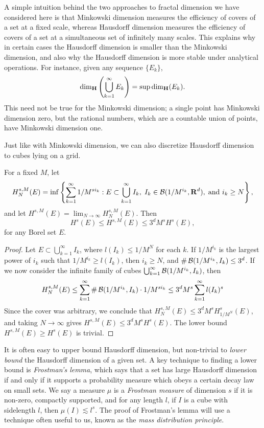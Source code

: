 A simple intuition behind the two approaches to fractal dimension we have considered here is that Minkowski dimension measures the efficiency of covers of a set at a fixed scale, whereas Hausdorff dimension measures the efficiency of covers of a set at a simultaneous set of infinitely many scales. This explains why in certain cases the Hausdorff dimension is smaller than the Minkowski dimension, and also why the Hausdorff dimension is more stable under analytical operations. For instance, given any sequence $\{ E_k \}$,
%
\[ \operatorname{\dim_{\mathbf{H}}} \left(\bigcup_{k = 1}^\infty E_k \right) = \sup \operatorname{\dim_{\mathbf{H}}}(E_k). \]
%
This need not be true for the Minkowski dimension; a single point has Minkowski dimension zero, but the rational numbers, which are a countable union of points, have Minkowski dimension one.

Just like with Minkowski dimension, we can also discretize Hausdorff dimension to cubes lying on a grid.

\begin{lemma}
	For a fixed $M$, let
	\[ H^{s,M}_N(E) = \inf \left\{ \sum_{k = 1}^\infty 1/M^{s i_k} : E \subset \bigcup_{k = 1}^\infty I_k,\; I_k \in \operatorname{\mathcal{B}}(1/M^{i_k},\operatorname{\mathbf{R}}^d), \; \text{and}\ i_k \geq N \right\}, \]
	and let $H^{s,M}(E) = \lim_{N \to \infty} H^{s,M}_N(E)$. Then
	\[ H^s(E) \leq H^{s,M}(E) \leq 3^d M^s H^s(E), \]
	for any Borel set $E$.
\end{lemma}
\begin{proof}
	Let $E \subset \bigcup_{k = 1}^\infty I_k$, where $l(I_k) \leq 1/M^N$ for each $k$. If $1/M^{i_k}$ is the largest power of $i_k$ such that $1/M^{i_k} \geq l(I_k)$, then $i_k \geq N$, and $\# \operatorname{\mathcal{B}}(1/M^{i_k},I_k) \leq 3^d$. If we now consider the infinite family of cubes $\bigcup_{k = 1}^\infty \operatorname{\mathcal{B}}(1/M^{i_k}, I_k)$, then
	\[ H^{s,M}_N(E) \leq \sum_{k = 1}^\infty \# \operatorname{\mathcal{B}}(1/M^{i_k},I_k) \cdot 1/M^{s i_k} \leq 3^d M^s \sum_{k = 1}^\infty l(I_k)^s \]
	Since the cover was arbitrary, we conclude that $H^{s,M}_N(E) \leq 3^d M^s H^s_{1/M^N}(E)$, and taking $N \to \infty$ gives $H^{s,M}(E) \leq 3^d M^s H^s(E)$. The lower bound $H^{s,M}(E) \geq H^s(E)$ is trivial.
\end{proof}

It is often easy to upper bound Hausdorff dimension, but non-trivial to \emph{lower bound} the Hausdorff dimension of a given set. A key technique to finding a lower bound is \emph{Frostman's lemma}, which says that a set has large Hausdorff dimension if and only if it supports a probability measure which obeys a certain decay law on small sets. We say a measure $\mu$ is a \emph{Frostman measure} of dimension $s$ if it is non-zero, compactly supported, and for any length $l$, if $I$ is a cube with sidelength $l$, then $\mu(I) \lesssim l^s$. The proof of Frostman's lemma will use a technique often useful to us, known as the \emph{mass distribution principle}.

